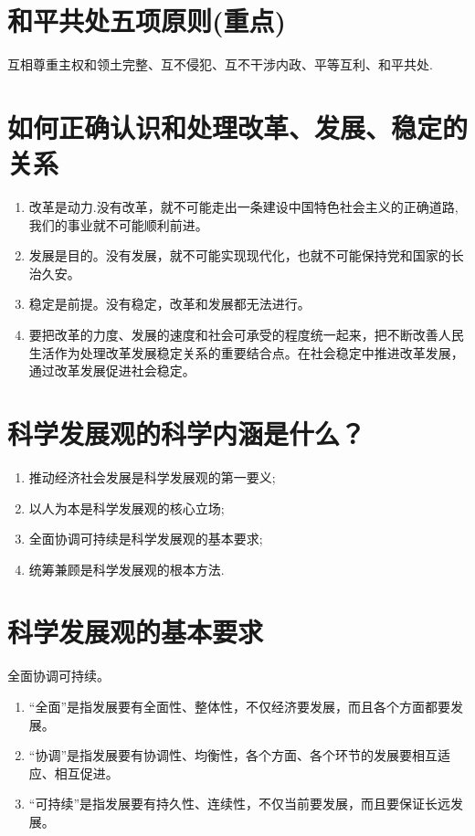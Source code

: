 \documentclass[12pt, a4paper, oneside]{ctexbook}
\begin{document}
\section{和平共处五项原则(重点)}

互相尊重主权和领土完整、互不侵犯、互不干涉内政、平等互利、和平共处.

\section{如何正确认识和处理改革、发展、稳定的关系}

\begin{enumerate}
\item 改革是动力.没有改革，就不可能走出一条建设中国特色社会主义的正确道路,我们的事业就不可能顺利前进。

\item 发展是目的。没有发展，就不可能实现现代化，也就不可能保持党和国家的长治久安。

\item 稳定是前提。没有稳定，改革和发展都无法进行。

\item 要把改革的力度、发展的速度和社会可承受的程度统一起来，把不断改善人民生活作为处理改革发展稳定关系的重要结合点。在社会稳定中推进改革发展，通过改革发展促进社会稳定。
\end{enumerate}

\section{科学发展观的科学内涵是什么？}
\begin{enumerate}
\item 推动经济社会发展是科学发展观的第一要义;
\item 以人为本是科学发展观的核心立场;
\item 全面协调可持续是科学发展观的基本要求;
\item 统筹兼顾是科学发展观的根本方法.
\end{enumerate}

\section{科学发展观的基本要求}

全面协调可持续。
\begin{enumerate}
\item “全面”是指发展要有全面性、整体性，不仅经济要发展，而且各个方面都要发展。

\item “协调”是指发展要有协调性、均衡性，各个方面、各个环节的发展要相互适应、相互促进。

\item “可持续”是指发展要有持久性、连续性，不仅当前要发展，而且要保证长远发展。
\end{enumerate}
\end{document}
